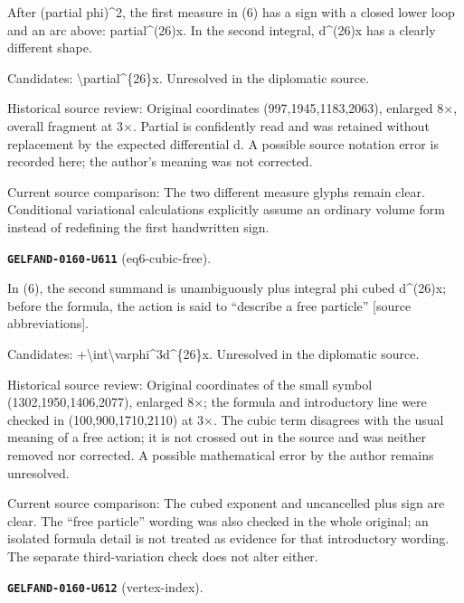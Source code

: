 After (partial phi)\textasciicircum{}2, the first measure in (6) has a sign with a closed lower loop and an arc above: partial\textasciicircum{}(26)x. In the second integral, d\textasciicircum{}(26)x has a clearly different shape.\par
Candidates: \textbackslash{}partial\textasciicircum{}\{26\}x. Unresolved in the diplomatic source.\par
Historical source review: Original coordinates (997,1945,1183,2063), enlarged 8×, overall fragment at 3×. Partial is confidently read and was retained without replacement by the expected differential d. A possible source notation error is recorded here; the author’s meaning was not corrected.\par
Current source comparison: The two different measure glyphs remain clear. Conditional variational calculations explicitly assume an ordinary volume form instead of redefining the first handwritten sign.\par\medskip
\par\noindent\leavevmode{}\label{GELFAND-0160-U611}\label{GELFAND-P001484:eq6-cubic-free}\textbf{\texttt{GELFAND-0160-U611}} (eq6-cubic-free).\nopagebreak[4]\par
In (6), the second summand is unambiguously plus integral phi cubed d\textasciicircum{}(26)x; before the formula, the action is said to “describe a free particle” [source abbreviations].\par
Candidates: +\textbackslash{}int\textbackslash{}varphi\textasciicircum{}3d\textasciicircum{}\{26\}x. Unresolved in the diplomatic source.\par
Historical source review: Original coordinates of the small symbol (1302,1950,1406,2077), enlarged 8×; the formula and introductory line were checked in (100,900,1710,2110) at 3×. The cubic term disagrees with the usual meaning of a free action; it is not crossed out in the source and was neither removed nor corrected. A possible mathematical error by the author remains unresolved.\par
Current source comparison: The cubed exponent and uncancelled plus sign are clear. The “free particle” wording was also checked in the whole original; an isolated formula detail is not treated as evidence for that introductory wording. The separate third-variation check does not alter either.\par\medskip
\par\noindent\leavevmode{}\label{GELFAND-0160-U612}\label{GELFAND-P001484:vertex-index}\textbf{\texttt{GELFAND-0160-U612}} (vertex-index).\nopagebreak[4]\par
